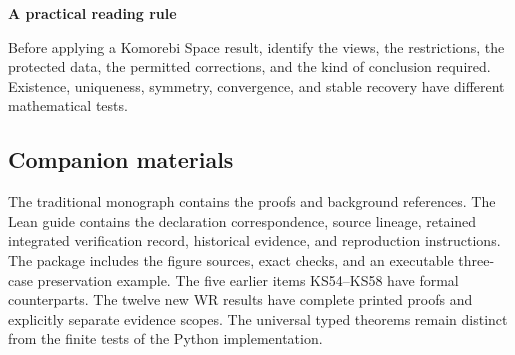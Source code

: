 \documentclass[11pt]{article}
\begin{document}
\begin{insight}
\textbf{A practical reading rule}\par
Before applying a Komorebi Space result, identify the views, the restrictions, the protected data, the permitted corrections, and the kind of conclusion required. Existence, uniqueness, symmetry, convergence, and stable recovery have different mathematical tests.
\end{insight}

\subsection*{Companion materials}
The traditional monograph contains the proofs and background references. The Lean guide contains the declaration correspondence, source lineage, retained integrated verification record, historical evidence, and reproduction instructions. The package includes the figure sources, exact checks, and an executable three-case preservation example. The five earlier items KS54--KS58 have formal counterparts. The twelve new WR results have complete printed proofs and explicitly separate evidence scopes. The universal typed theorems remain distinct from the finite tests of the Python implementation.
\end{document}
